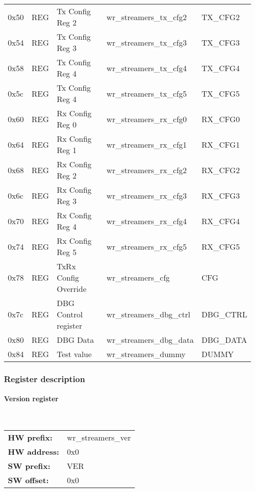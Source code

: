 {\begin{tabular}{|l|l|l|l|l|}
0x50& REG & Tx Config Reg 2 & wr\_streamers\_tx\_cfg2 & TX\_CFG2\\
0x54& REG & Tx Config Reg 3 & wr\_streamers\_tx\_cfg3 & TX\_CFG3\\
0x58& REG & Tx Config Reg 4 & wr\_streamers\_tx\_cfg4 & TX\_CFG4\\
0x5c& REG & Tx Config Reg 4 & wr\_streamers\_tx\_cfg5 & TX\_CFG5\\
0x60& REG & Rx Config Reg 0 & wr\_streamers\_rx\_cfg0 & RX\_CFG0\\
0x64& REG & Rx Config Reg 1 & wr\_streamers\_rx\_cfg1 & RX\_CFG1\\
0x68& REG & Rx Config Reg 2 & wr\_streamers\_rx\_cfg2 & RX\_CFG2\\
0x6c& REG & Rx Config Reg 3 & wr\_streamers\_rx\_cfg3 & RX\_CFG3\\
0x70& REG & Rx Config Reg 4 & wr\_streamers\_rx\_cfg4 & RX\_CFG4\\
0x74& REG & Rx Config Reg 5 & wr\_streamers\_rx\_cfg5 & RX\_CFG5\\
0x78& REG & TxRx Config Override & wr\_streamers\_cfg & CFG\\
0x7c& REG & DBG Control register & wr\_streamers\_dbg\_ctrl & DBG\_CTRL\\
0x80& REG & DBG Data & wr\_streamers\_dbg\_data & DBG\_DATA\\
0x84& REG & Test value & wr\_streamers\_dummy & DUMMY\\
\hline
\end{tabular}
}

\subsubsection{Register description}
\paragraph*{Version register}\mbox{}\\\vskip 6pt
\begin{tabular}{l l }
{\bf HW prefix:}  & wr\_streamers\_ver\\
{\bf HW address:}  & 0x0\\
{\bf SW prefix:}  & VER\\
{\bf SW offset:}  & 0x0\\
\end{tabular}


